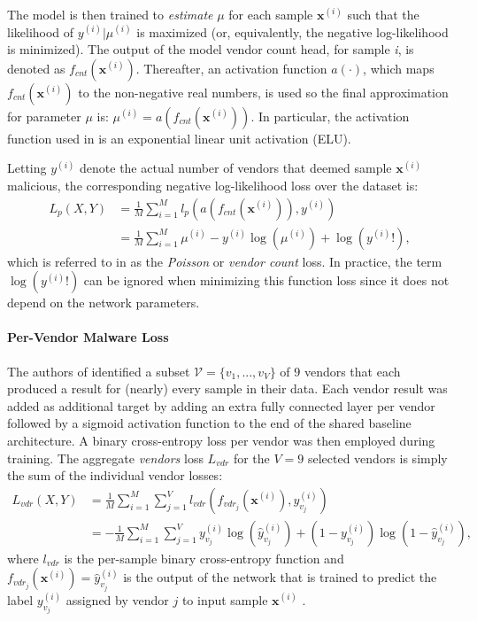 \documentclass[pdfa%
,cucitura%
]{toptesi}
\begin{document}
The model is then trained to \textit{estimate} $\mu$ for each sample $\textbf{x}^{(i)}$ such that the likelihood of $y^{(i)}|\mu^{(i)}$ is maximized (or, equivalently, the negative log-likelihood is minimized). The output of the model vendor count head, for sample \textit{i}, is denoted as $f_{cnt}(\textbf{x}^{(i)})$. Thereafter, an activation function $a(\cdot)$, which maps $f_{cnt}(\textbf{x}^{(i)})$ to the non-negative real numbers, is used so the final approximation for parameter $\mu$ is: $\mu^{(i)} = a(f_{cnt}(\textbf{x}^{(i)}))$. In particular, the activation function used in \cite{ruddALOHA} is an exponential linear unit activation (ELU).

Letting $y^{(i)}$ denote the actual number of vendors that deemed sample $\textbf{x}^{(i)}$ malicious, the corresponding negative log-likelihood loss over the dataset is:
\begin{equation} \label{eq:alohaVendorCountLoss}
	\begin{split}
		L_p(X,Y) & = \frac{1}{M} \sum_{i=1}^{M} l_p (a(f_{cnt}(\textbf{x}^{(i)})), y^{(i)}) \\ & = \frac{1}{M} \sum_{i=1}^{M} \mu^{(i)} - y^{(i)} \log(\mu^{(i)}) + \log(y^{(i)}!),
	\end{split}
\end{equation}
which is referred to in \cite{ruddALOHA} as the \textit{Poisson} or \textit{vendor count} loss. In practice, the term $\log(y^{(i)}!)$ can be ignored when minimizing this function loss since it does not depend on the network parameters.

\paragraph{Per-Vendor Malware Loss}
The authors of \cite{ruddALOHA} identified a subset $\mathcal{V} = \{v_1, ..., v_V\}$ of $9$ vendors that each produced a result for (nearly) every sample in their data. Each vendor result was added as additional target by adding an extra fully connected layer per vendor followed by a sigmoid activation function to the end of the shared baseline architecture. A binary cross-entropy loss per vendor was then employed during training. The aggregate \textit{vendors} loss $L_{vdr}$ for the $V = 9$ selected vendors is simply the sum of the individual vendor losses:
\begin{equation} \label{eq:alohaPerVendorMalwareLoss}
	\begin{split}
		L_{vdr}(X,Y) & = \frac{1}{M} \sum_{i = 1}^{M} \sum_{j = 1}^{V} l_{vdr}(f_{vdr_j}(\textbf{x}^{(i)}), y_{v_j}^{(i)}) \\ & = - \frac{1}{M} \sum_{i = 1}^{M} \sum_{j = 1}^{V} y_{v_j}^{(i)} \log(\hat{y}_{v_j}^{(i)}) + (1 - y_{v_j}^{(i)}) \log{(1 - \hat{y}_{v_j}^{(i)})},
	\end{split}
\end{equation}
where $l_{vdr}$ is the per-sample binary cross-entropy function and $f_{vdr_j}(\textbf{x}^{(i)}) = \hat{y}_{v_j}^{(i)}$ is the output of the network that is trained to predict the label $y_{v_j}^{(i)}$ assigned by vendor $j$ to input sample $\textbf{x}^{(i)}$ \cite{ruddALOHA}.
\end{document}
